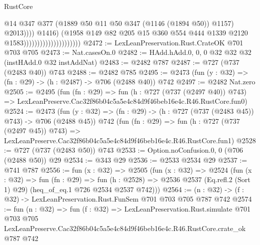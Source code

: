 \begin{lexlean}{RustCore}
\begin{coremodule}
                                                      @14
                                                      @347
                                                      @377
                                                      (@1889
                                                        @50
                                                        @11
                                                        @50
                                                        @347
                                                        (@1146 (@1894 @50))
                                                        @1157)
                                                      @2013))))
                                              @1416)
                                            (@1958
                                              @149
                                              @82
                                              @205
                                              @15
                                              @360
                                              @554
                                              @444
                                              @1339
                                              @2120
                                              @1583)))))))))))))))))))))
@2472 := LexLeanPreservation.Rust.CrateOK @701 @703 @705
@2473 := Nat.casesOn.{0}
@2482 := HAdd.hAdd.{0, 0, 0} @32 @32 @32 (instHAdd.{0} @32 instAddNat)
@2483 := @2482 @787
@2487 := @727 (@737 (@2483 @40)) @743
@2488 := @2482 @785
@2495 := @2473 (fun (y : @32) => (fn : @29) -> (h : @2487) -> @706 (@2488 @40)) @742
@2497 := @2482 Nat.zero
@2505 := @2495
    (fun (fn : @29) =>
    fun (h : @727 (@737 (@2497 @40)) @743) =>
    LexLeanPreserve.Cac32f86b04c5a5e4c84d9f46beb16e4c.R46.RustCore.fun0)
@2524 := @2473
    (fun (y : @32) => (fn : @29) -> (h : @727 (@737 (@2483 @45)) @743) -> @706 (@2488 @45))
    @742
    (fun (fn : @29) =>
    fun (h : @727 (@737 (@2497 @45)) @743) =>
    LexLeanPreserve.Cac32f86b04c5a5e4c84d9f46beb16e4c.R46.RustCore.fun1)
@2528 := @727 (@737 (@2483 @50)) @743
@2533 := Option.noConfusion.{0, 0} (@706 (@2488 @50)) @29
@2534 := @343 @29
@2536 := @2533 @2534 @29
@2537 := @741 @787
@2556 := fun (x : @32) =>
  @2505
    (fun (x : @32) =>
    @2524
      (fun (x : @32) =>
      fun (fn : @29) =>
      fun (h : @2528) =>
      @2536 @2537 (Eq.refl.{2} (Sort 1) @29) (heq_of_eq.{1} @726 @2534 @2537 @742)))
@2564 := (n : @32) -> (f : @32) -> LexLeanPreservation.Rust.FunSem @701 @703 @705 @787 @742
@2574 := fun (n : @32) =>
  fun (f : @32) =>
  LexLeanPreservation.Rust.simulate
    @701
    @703
    @705
    LexLeanPreserve.Cac32f86b04c5a5e4c84d9f46beb16e4c.R46.RustCore.crate_ok
    @787
    @742
\end{coremodule}
\end{lexlean}
